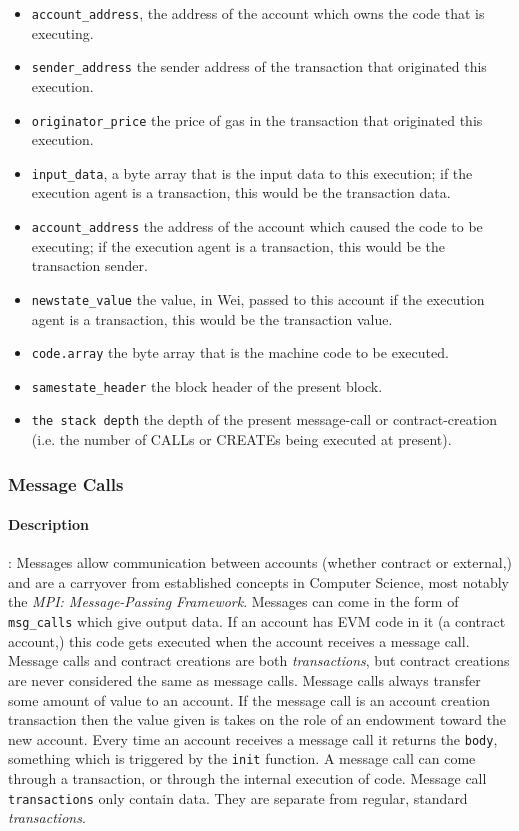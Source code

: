 \documentclass[10pt,a4paper,leqno,bibliography=totoc]{scrartcl}
\newenvironment{alphafootnotes}
{\par\edef\savedfootnotenumber{\number\value{footnote}}
\renewcommand{\thefootnote}{\alph{footnote}}
\setcounter{footnote}{0}}
{\par\setcounter{footnote}{\savedfootnotenumber}}
\begin{document}
\begin{alphafootnotes}
\begin{multicols*}{2}
				\begin{itemize}
					\item \texttt{account\_address}, the address of the account which owns the code that is executing.
					\item \texttt{sender\_address} the sender address of the transaction that originated this execution.
					\item \texttt{originator\_price} the price of gas in the transaction that originated this execution.
					\item \texttt{input\_data}, a byte array that is the input data to this execution; if the execution agent is a transaction, this would be the transaction data.
					\item \texttt{account\_address}  the address of the account which caused the code to be executing; if the execution agent is a transaction, this would be the transaction sender.
					\item \texttt{newstate\_value} the value, in Wei, passed to this account if the execution agent is a transaction, this would be the transaction value.\supercite{Wood2017}
					\item \texttt{code.array} the byte array that is the machine code to be executed.\supercite{Wood2017}
					\item \texttt{samestate\_header} the block header of the present block.
					\item \texttt{the stack depth} the depth of the present message-call or contract-creation (i.e. the number of {\small CALL}s or {\small CREATE}s being executed at present).\supercite{Wood2017}
				\end{itemize}

			\subsubsection{Message Calls}
\paragraph{Description}: Messages allow communication between accounts (whether contract or external,) and are a carryover from established concepts in Computer Science, most notably the \textsl{MPI: Message-Passing Framework}. Messages can come in the form of \texttt{msg\_calls} which give output data. If an account has EVM code in it (a contract account,) this code gets executed when the account receives a message call. Message calls and contract creations are both \textsl{transactions}, but contract creations are never considered the same as message calls. Message calls always transfer some amount of value to an account. If the message call is an account creation transaction then the value given is takes on the role of an endowment toward the new account. Every time an account receives a message call it returns the \texttt{body}, something which is triggered by the \texttt{init} function. A message call can come through a transaction, or through the internal execution of code. Message call \texttt{transactions} only contain data. They are separate from regular, standard \textit{transactions}.


\end{multicols*}
\end{alphafootnotes}
\end{document}
